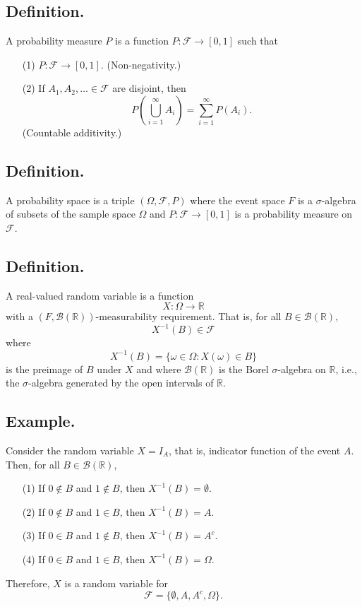 \documentclass[titlepage]{article}
\begin{document}
\subsection{Definition.} A probability measure $P$ is a function $P: \mathcal{F} \to [0, 1]$ such that 
\begin{enumerate}
\item[(1)] $P: \mathcal{F} \to [0, 1]$. (Non-negativity.)
\item[(2)] If $A_{1}, A_{2}, \ldots \in \mathcal{F}$ are disjoint, then 
$$P\left(\bigcup_{i=1}^{\infty}A_{i}\right) = \sum_{i=1}^{\infty}P(A_{i}).$$
(Countable additivity.)
\end{enumerate}

\subsection{Definition.} A probability space is a triple $(\Omega, \mathcal{F}, P)$ where the event space $F$ is a $\sigma$-algebra of subsets of the sample space $\Omega$ and $P: \mathcal{F} \to [0, 1]$ is a probability measure on $\mathcal{F}$.

\subsection{Definition.} A real-valued random variable is a function 
$$X: \Omega \to \mathbb{R}$$
with a $(F, \mathcal{B}(\mathbb{R}))$-measurability requirement. That is, for all $B \in \mathcal{B}(\mathbb{R})$, 
$$X^{-1}(B) \in \mathcal{F}$$
where 
$$X^{-1}(B) = \{\omega \in \Omega: X(\omega) \in B\}$$
is the preimage of $B$ under $X$ and where $\mathcal{B}(\mathbb{R})$ is the Borel $\sigma$-algebra on $\mathbb{R}$, i.e., the $\sigma$-algebra generated by the open intervals of $\mathbb{R}$.

\subsection{Example.} Consider the random variable $X = I_{A}$, that is, indicator function of the event $A$. Then, for all $B \in \mathcal{B}(\mathbb{R})$, 
\begin{enumerate}
\item[(1)] If $0 \not\in B$ and $1 \not\in B$, then $X^{-1}(B) = \emptyset$.
\item[(2)] If $0 \not\in B$ and $1 \in B$, then $X^{-1}(B) = A$.
\item[(3)] If $0 \in B$ and $1 \not\in B$, then $X^{-1}(B) = A^{c}$.
\item[(4)] If $0 \in B$ and $1 \in B$, then $X^{-1}(B) = \Omega$.
\end{enumerate}
Therefore, $X$ is a random variable for 
$$\mathcal{F} = \{\emptyset, A, A^{c}, \Omega\}.$$
\end{document}
